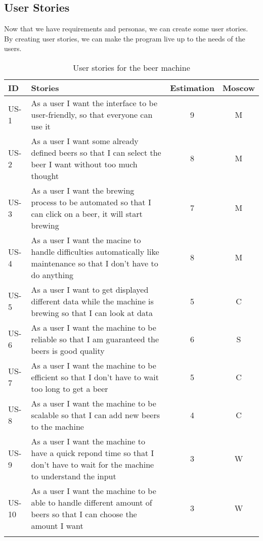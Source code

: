 \subsection{User Stories}

Now that we have requirements and personas, we can create some user stories. By creating user stories, we can make the program live up to the needs of the users.

\begin{table}[H]
    \begin{center}
        \sloppy
        \begin{longtable}{|p{1cm}|p{11cm}|c|c|}
            \hline
            ID    & Stories                                                                                                                       & Estimation & Moscow \\ \hline
            US-1  & As a user I want the interface to be user-friendly, so that everyone can use it                                               & 9          & M      \\ \hline
            US-2  & As a user I want some already defined beers  so that I can select the beer I want without too much thought                    & 8          & M      \\ \hline
            US-3  & As a user I want the brewing process to be automated so that I can click on a beer, it will start brewing                     & 7          & M      \\ \hline
            US-4  & As a user I want the macine to handle difficulties automatically like maintenance so that I don't have to do anything         & 8          & M      \\ \hline
            US-5  & As a user I want to get displayed different data while the machine is brewing so that I can look at data                      & 5          & C      \\ \hline
            US-6  & As a user I want the machine to be reliable so that I am guaranteed the beers is good quality                                 & 6          & S      \\ \hline
            US-7  & As a user I want the machine to be efficient so that I don't have to wait too long to get a beer                              & 5          & C      \\ \hline
            US-8  & As a user I want the machine to be scalable so that I can add new beers to the machine                                        & 4          & C      \\ \hline
            US-9  & As a user I want the machine to have a quick repond time so that I don't have to wait for the machine to understand the input & 3          & W      \\ \hline
            US-10 & As a user I want the machine to be able to handle different amount of beers so that I can choose the amount I want            & 3          & W      \\ \hline

            \caption{User stories for the beer machine}
            \label{tab:user_stories}
        \end{longtable}
    \end{center}
\end{table}